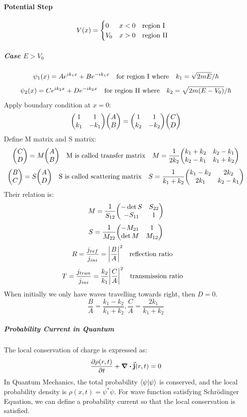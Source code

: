 \documentclass[a4paper,10pt]{article}
\begin{document}
\paragraph{Potential Step}
$$V(x)=\begin{cases}
        0   & x<0\qq{region I}  \\
        V_0 & x>0\qq{region II}
    \end{cases}$$
\subparagraph{Case $E>V_0$}
$$\psi_1(x)=Ae^{ik_1x}+Be^{-ik_1x}\qq{for region I where}k_1=\sqrt{2mE}/\hbar$$
$$\psi_2(x)=Ce^{ik_2x}+De^{-ik_2x}\qq{for region II where}k_2=\sqrt{2m(E-V_0)}/\hbar$$
Apply boundary condition at $x=0$:
$$\mqty(1&1\\k_1&-k_1)\mqty(A\\B)=\mqty(1&1\\k_2&-k_2)\mqty(C\\D)$$
Define M matrix and S matrix:
$$\mqty(C\\D)=M\mqty(A\\B)\qq{M is called transfer matrix}M=\frac{1}{2k_2}\mqty(k_{1}+k_{2}&k_{2}-k_{1}\\k_{2}-k_{1}&k_{1}+k_{2})$$
$$\mqty(B\\C)=S\mqty(A\\D)\qq{S is called scattering matrix}S=\frac{1}{k_1+k_2}\mqty(k_{1}-k_{2}&2k_{2}\\2k_{1}&k_{2}-k_{1})$$
Their relation is:
$$M=\frac{1}{S_{12}}\mqty(-\det S&S_{22}\\-S_{11}&1)$$
$$S=\frac{1}{M_{22}}\mqty(-M_{21}&1\\\det M&M_{12})$$
$$R=\frac{j_{ref}}{j_{ini}}=\abs{\frac{B}{A}}^2\qq{reflection ratio}$$
$$T=\frac{j_{tran}}{j_{ini}}=\frac{k_2}{k_1}\abs{\frac{C}{A}}^2\qq{transmission ratio}$$
When initially we only have waves travelling towards right, then $D=0$.
$$\frac{B}{A}=\frac{k_1-k_2}{k_1+k_2},\frac{C}{A}=\frac{2k_1}{k_1+k_2}$$
\subparagraph{Probability Current in Quantum}
The local conservation of charge is expressed as:
$$\pdv{\rho(r,t)}{t}+\div\va{j}(r,t)=0$$
In Quantum Mechanics, the total probability $\bra{\psi}\ket{\psi}$ is conserved, and the local probability density is $\rho(x,t)=\psi^\ast\psi$.
For wave function satisfying Schrödinger Equation, we can define a probability current so that the local conservation is satisfied.
\end{document}
